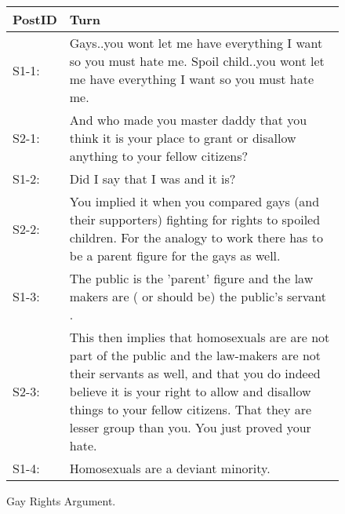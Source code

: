 \documentclass[11pt]{article}
\begin{document}
\begin{figure}[h!t]
\begin{small}

{\begin{tabular}{|p{.27in}p{2.43in}|}
\hline {\bf PostID} & {\bf Turn}%
\\ \hline \hline

S1-1: & Gays..you wont let me have everything I want so you must hate me. Spoil child..you wont let me have everything I want so you must hate me. \\

S2-1: & And who made you master daddy that you think it is your place to grant or disallow anything to your fellow citizens?\\

S1-2: & Did I say that I was and it is?\\

S2-2: & You implied it when you compared gays (and their supporters) fighting for rights to spoiled children. For the analogy to work there has to be a parent figure for the gays as well.\\
S1-3: & The public is the 'parent' figure and the law makers are ( or should be) the public's servant .\\

S2-3: & This then implies that homosexuals are are not part of the public and the law-makers are not their servants as well, and that you do indeed believe it is your right to allow and disallow things to your fellow citizens. That they are lesser group than you. You just proved your hate. \\
S1-4: & Homosexuals are a deviant minority. 
\\ \hline
\end{tabular}}
\end{small}
\caption{\label{Gay-Rights-dialog1} Gay Rights Argument.}
\end{figure}
\end{document}
